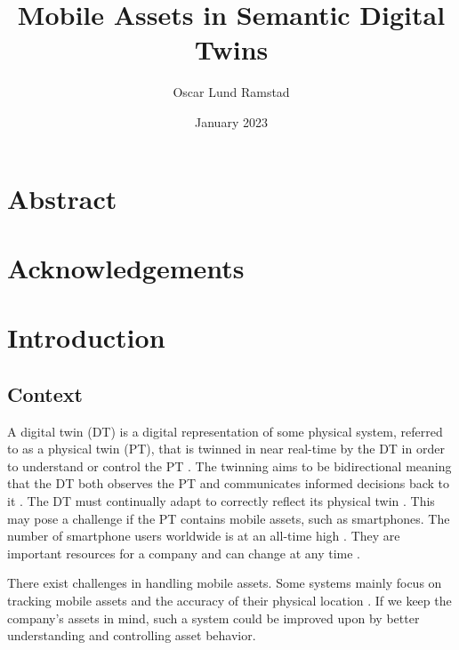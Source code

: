 \documentclass{article}
\begin{document}
\title{Mobile Assets in Semantic Digital Twins}
\author{Oscar Lund Ramstad}
\date{January 2023}

\duoforside[dept={Institute for Informatics}, program={Informatics: Programming and System Architecture}, short]

\section*{Abstract}


\newpage

\section*{Acknowledgements}
\newpage

\tableofcontents
\newpage

\listoftables
\newpage

\listoffigures
\newpage

\setcounter{page}{1}

\section{Introduction}\label{sec:Introduction}
\subsection{Context}
A digital twin (DT) is a digital representation of some physical system, referred to as a physical twin (PT), that is twinned in near real-time by the DT in order to understand or control the PT \cite{grieves_digital_2017, kamburjan_digital_2022}. The twinning aims to be bidirectional meaning that the DT both observes the PT and communicates informed decisions back to it \cite{kamburjan_digital_2022, fuller_digital_2020}. The DT must continually adapt to correctly reflect its physical twin \cite{kamburjan_twinning-by-construction_2022}. This may pose a challenge if the PT contains mobile assets, such as smartphones. The number of smartphone users worldwide is at an all-time high \cite{petroc_taylor_number_2023}. They are important resources for a company and can change at any time \cite{marcheta_development_2022}.

There exist challenges in handling mobile assets. Some systems mainly focus on tracking mobile assets and the accuracy of their physical location \cite{marcheta_development_2022,akram_design_2021}. If we keep the company's assets in mind, such a system could be improved upon by better understanding and controlling asset behavior. 
\end{document}
